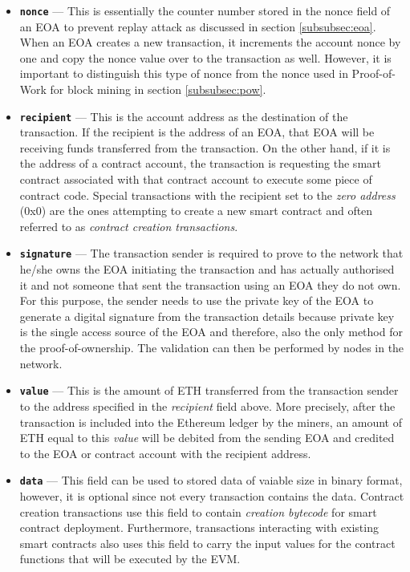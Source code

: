 \begin{itemize}
	\item \textbf{\texttt{nonce}} --- This is essentially the counter number stored in the nonce field of an EOA to prevent replay attack as discussed in section \ref{subsubsec:eoa}. When an EOA creates a new transaction, it increments the account nonce by one and copy the nonce value over to the transaction as well. However, it is important to distinguish this type of nonce from the nonce used in Proof-of-Work for block mining in section \ref{subsubsec:pow}.
	\item \textbf{\texttt{recipient}} --- This is the account address as the destination of the transaction. If the recipient is the address of an EOA, that EOA will be receiving funds transferred from the transaction. On the other hand, if it is the address of a contract account, the transaction is requesting the smart contract associated with that contract account to execute some piece of contract code. Special transactions with the recipient set to the \textit{zero address} (0x0) are the ones attempting to create a new smart contract and often referred to as  \textit{contract creation transactions}.
	\item \textbf{\texttt{signature}} --- The transaction sender is required to prove to the network that he/she owns the EOA initiating the transaction and has actually authorised it and not someone that sent the transaction using an EOA they do not own. For this purpose, the sender needs to use the private key of the EOA to generate a digital signature from the transaction details because private key is the single access source of the EOA and therefore, also the only method for the proof-of-ownership. The validation can then be performed by nodes in the network.

	\item \textbf{\texttt{value}} --- This is the amount of ETH transferred from the transaction sender to the address specified in the \textit{recipient} field above. More precisely, after the transaction is included into the Ethereum ledger by the miners, an amount of ETH equal to this \textit{value} will be debited from the sending EOA and credited to the EOA or contract account with the recipient address.
	\item \textbf{\texttt{data}} --- This field can be used to stored data of vaiable size in binary format, however, it is optional since not every transaction contains the data. Contract creation transactions use this field to contain \textit{creation bytecode} for smart contract deployment. Furthermore, transactions interacting with existing smart contracts also uses this field to carry the input values for the contract functions that will be executed by the EVM.


\end{itemize}
